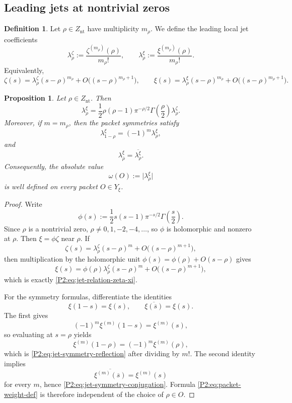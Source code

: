\documentclass[11pt,a4paper]{article}
\numberwithin{equation}{section}
\newtheorem{proposition}[theorem]{Proposition}
\theoremstyle{definition}
\newtheorem{definition}[theorem]{Definition}
\theoremstyle{remark}
\begin{document}
\subsection{Leading jets at nontrivial zeros}

\begin{definition}
Let $\rho\in Z_{\mathrm{nt}}$ have multiplicity $m_\rho$.  We define the leading local jet coefficients
\[
\lambda_\rho^{\zeta}:=\frac{\zeta^{(m_\rho)}(\rho)}{m_\rho!},
\qquad
\lambda_\rho^{\xi}:=\frac{\xi^{(m_\rho)}(\rho)}{m_\rho!}.
\]
Equivalently,
\[
\zeta(s)=\lambda_\rho^{\zeta}(s-\rho)^{m_\rho}+O\bigl((s-\rho)^{m_\rho+1}\bigr),
\qquad
\xi(s)=\lambda_\rho^{\xi}(s-\rho)^{m_\rho}+O\bigl((s-\rho)^{m_\rho+1}\bigr).
\]
\end{definition}

\begin{proposition}\label{P2:prop:leading-jets-nontrivial}
Let $\rho\in Z_{\mathrm{nt}}$.  Then
\begin{equation}\label{P2:eq:jet-relation-zeta-xi}
\lambda_\rho^{\xi}=\frac12\rho(\rho-1)\pi^{-\rho/2}\Gamma\!\left(\frac{\rho}{2}\right)\lambda_\rho^{\zeta}.
\end{equation}
Moreover, if $m=m_\rho$, then the packet symmetries satisfy
\begin{equation}\label{P2:eq:jet-symmetry-reflection}
\lambda_{1-\rho}^{\xi}=(-1)^m\lambda_\rho^{\xi},
\end{equation}
and
\begin{equation}\label{P2:eq:jet-symmetry-conjugation}
\lambda_{\overline\rho}^{\xi}=\overline{\lambda_\rho^{\xi}}.
\end{equation}
Consequently, the absolute value
\begin{equation}\label{P2:eq:packet-weight-def}
\omega(O):=\bigl|\lambda_\rho^{\xi}\bigr|
\end{equation}
is well defined on every packet $O\in Y_\xi$.
\end{proposition}

\begin{proof}
Write
\[
\phi(s):=\frac12 s(s-1)\pi^{-s/2}\Gamma\!\left(\frac{s}{2}\right).
\]
Since $\rho$ is a nontrivial zero, $\rho\neq 0,1,-2,-4,\dots$, so $\phi$ is holomorphic and nonzero at $\rho$.  Then $\xi=\phi\zeta$ near $\rho$.  If
\[
\zeta(s)=\lambda_\rho^{\zeta}(s-\rho)^m+O\bigl((s-\rho)^{m+1}\bigr),
\]
then multiplication by the holomorphic unit $\phi(s)=\phi(\rho)+O(s-\rho)$ gives
\[
\xi(s)=\phi(\rho)\lambda_\rho^{\zeta}(s-\rho)^m+O\bigl((s-\rho)^{m+1}\bigr),
\]
which is exactly \eqref{P2:eq:jet-relation-zeta-xi}.

For the symmetry formulas, differentiate the identities
\[
\xi(1-s)=\xi(s),
\qquad
\overline{\xi(\overline s)}=\xi(s).
\]
The first gives
\[
(-1)^m\xi^{(m)}(1-s)=\xi^{(m)}(s),
\]
so evaluating at $s=\rho$ yields
\[
\xi^{(m)}(1-\rho)=(-1)^m\xi^{(m)}(\rho),
\]
which is \eqref{P2:eq:jet-symmetry-reflection} after dividing by $m!$.  The second identity implies
\[
\overline{\xi^{(m)}(\overline s)}=\xi^{(m)}(s)
\]
for every $m$, hence \eqref{P2:eq:jet-symmetry-conjugation}.  Formula \eqref{P2:eq:packet-weight-def} is therefore independent of the choice of $\rho\in O$.
\end{proof}
\end{document}
